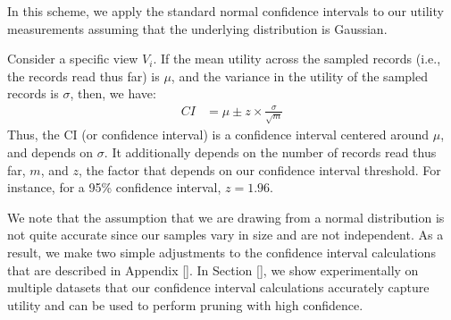  In this scheme,
we apply the standard normal confidence intervals to our utility measurements
assuming that the underlying distribution is Gaussian.

Consider a specific view $V_i$. 
If the mean utility across the sampled records 
(i.e., the records read thus far) is $\mu$,
and the variance in the utility of the sampled records
is $\sigma$, then, we have:
\begin{align}
CI & = \mu \pm z \times \frac{\sigma}{\sqrt{m}}
\end{align}
Thus, the CI (or confidence interval) is 
a confidence interval centered around $\mu$, 
and depends on $\sigma$. 
It additionally depends on the number of records
read thus far, $m$,
and $z$, the factor that depends on our confidence interval threshold.
For instance, for a 95\% confidence interval, $z = 1.96$.

We note that the assumption that we are drawing from a normal distribution is
not quite accurate since our samples vary in size and are not independent.
As a result, we make two simple adjustments to the confidence interval
calculations that are described in Appendix \ref{}.
In Section \ref{}, we show experimentally on multiple datasets that our
confidence interval calculations accurately capture utility and can be used to
perform pruning with high confidence.







